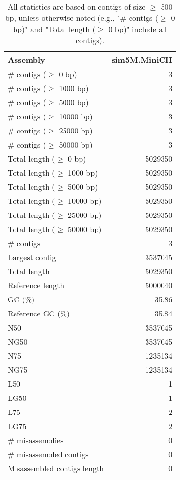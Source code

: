 \documentclass[12pt,a4paper]{article}
\begin{document}
\begin{table}[ht]
\begin{center}
\caption{All statistics are based on contigs of size $\geq$ 500 bp, unless otherwise noted (e.g., "\# contigs ($\geq$ 0 bp)" and "Total length ($\geq$ 0 bp)" include all contigs).}
\begin{tabular}{|l*{1}{|r}|}
\hline
Assembly & sim5M.MiniCH \\ \hline
\# contigs ($\geq$ 0 bp) & 3 \\ \hline
\# contigs ($\geq$ 1000 bp) & 3 \\ \hline
\# contigs ($\geq$ 5000 bp) & 3 \\ \hline
\# contigs ($\geq$ 10000 bp) & 3 \\ \hline
\# contigs ($\geq$ 25000 bp) & 3 \\ \hline
\# contigs ($\geq$ 50000 bp) & 3 \\ \hline
Total length ($\geq$ 0 bp) & 5029350 \\ \hline
Total length ($\geq$ 1000 bp) & 5029350 \\ \hline
Total length ($\geq$ 5000 bp) & 5029350 \\ \hline
Total length ($\geq$ 10000 bp) & 5029350 \\ \hline
Total length ($\geq$ 25000 bp) & 5029350 \\ \hline
Total length ($\geq$ 50000 bp) & 5029350 \\ \hline
\# contigs & 3 \\ \hline
Largest contig & 3537045 \\ \hline
Total length & 5029350 \\ \hline
Reference length & 5000040 \\ \hline
GC (\%) & 35.86 \\ \hline
Reference GC (\%) & 35.84 \\ \hline
N50 & 3537045 \\ \hline
NG50 & 3537045 \\ \hline
N75 & 1235134 \\ \hline
NG75 & 1235134 \\ \hline
L50 & 1 \\ \hline
LG50 & 1 \\ \hline
L75 & 2 \\ \hline
LG75 & 2 \\ \hline
\# misassemblies & 0 \\ \hline
\# misassembled contigs & 0 \\ \hline
Misassembled contigs length & 0 \\ \hline

\end{tabular}
\end{center}
\end{table}
\end{document}
